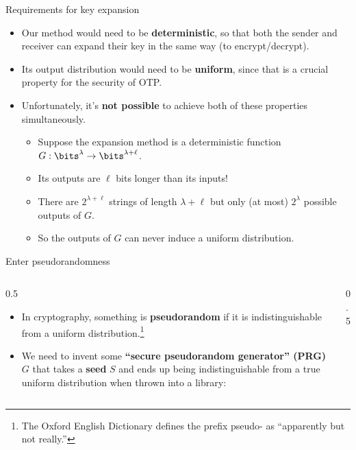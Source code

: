 \ifdefined\PRESENTATION\else\PassOptionsToClass{handout}{beamer}\fi\documentclass[aspectratio=169, lualatex]{beamer}
\begin{document}
\begin{frame}{Requirements for key expansion}
	\begin{itemize}
		\item Our method would need to be \textbf{deterministic}, so that both the sender and receiver can expand their key in the same way (to encrypt/decrypt).
		\item Its output distribution would need to be \textbf{uniform}, since that is a crucial property for the security of OTP.
		\item Unfortunately, it's \textbf{not possible} to achieve both of these properties simultaneously.
		      \begin{itemize}
			      \item Suppose the expansion method is a deterministic function $G: \bits^\lambda \rightarrow \bits^{\lambda+\ell}$.
			      \item Its outputs are $\ell$ bits longer than its inputs!
			      \item There are $2^{\lambda+\ell}$ strings of length $\lambda+\ell$ but only (at most) $2^\lambda$ possible outputs of $G$.
			      \item So the outputs of $G$ can never induce a uniform distribution.
		      \end{itemize}
	\end{itemize}
\end{frame}

\begin{frame}{Enter pseudorandomness}
	\begin{columns}[c]
		\begin{column}{0.5\textwidth}
			\begin{itemize}
				\item In cryptography, something is \textbf{pseudorandom} if it is indistinguishable from a uniform distribution.\footnote{The Oxford English Dictionary defines the prefix pseudo- as ``apparently but not really.''}
				\item We need to invent some \textbf{``secure pseudorandom generator'' (PRG)} $G$ that takes a \textbf{seed} $S$ and ends up being indistinguishable from a true uniform distribution when thrown into a library:
			\end{itemize}
		\end{column}
		\begin{column}{0.5\textwidth}
		\end{column}
	\end{columns}
\end{frame}
\end{document}
